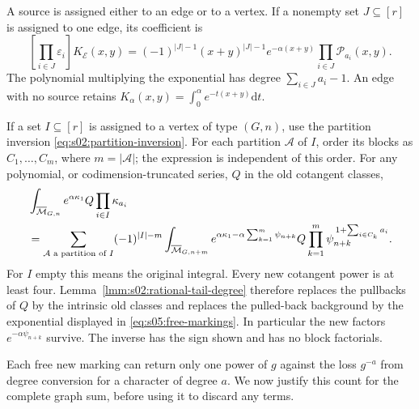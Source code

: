 \documentclass[a4paper,10pt]{article}
\numberwithin{equation}{section}
\newcommand{\MM}{\overline{\mathcal{M}}}
\newcommand{\dd}{\mathrm{d}}
\theoremstyle{paperplain}
\theoremstyle{paperremark}
\theoremstyle{paperplain}
\begin{document}
A source is assigned either to an edge or to a vertex. If a nonempty set
$J\subseteq[r]$ is assigned to one edge, its coefficient is
\begin{equation}\label{eq:s05:tagged-edge}
 [\textstyle\prod_{i\in J}\varepsilon_i]K_{\mathcal E}(x,y)
 =(-1)^{|J|-1}(x+y)^{|J|-1}e^{-\alpha(x+y)}
       \prod_{i\in J}\mathcal P_{a_i}(x,y).
\end{equation}
The polynomial multiplying the exponential has degree
$\sum_{i\in J}a_i-1$. An edge with no source retains
$K_\alpha(x,y)=\int_0^\alpha e^{-t(x+y)}\dd t$.

If a set $I\subseteq[r]$ is assigned to a vertex of type $(G,n)$,
use the partition inversion \eqref{eq:s02:partition-inversion}.
For each partition $\mathcal A$ of $I$, order its blocks as
$C_1,\ldots,C_m$, where $m=|\mathcal A|$; the expression is
independent of this order. For any polynomial, or
codimension-truncated series, $Q$ in the old cotangent classes,
\begin{align}
 &\int_{\MM_{G,n}}e^{\alpha\kappa_1}Q
                   \prod_{i\in I}\kappa_{a_i}\notag\\
 &=\sum_{\mathcal A\text{ a partition of }I}(-1)^{|I|-m}
   \int_{\MM_{G,n+m}}
    e^{\alpha\kappa_1-\alpha\sum_{k=1}^m\psi_{n+k}}
    Q
    \prod_{k=1}^m\psi_{n+k}^{\,1+\sum_{i\in C_k}a_i}.
 \label{eq:s05:free-markings}
\end{align}
For $I$ empty this means the original integral. Every new cotangent
power is at least four. Lemma~\ref{lmm:s02:rational-tail-degree}
therefore replaces the pullbacks of $Q$ by the intrinsic old classes
and replaces the pulled-back background by the exponential displayed
in \eqref{eq:s05:free-markings}. In particular the new factors
$e^{-\alpha\psi_{n+k}}$ survive. The inverse has the sign shown and
has no block factorials.

Each free new marking can return only one power of $g$ against the
loss $g^{-a}$ from degree conversion for a character of degree $a$.
We now justify this count for the complete graph sum, before using
it to discard any terms.
\end{document}
